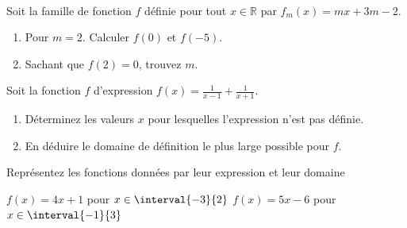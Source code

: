 \documentclass[main.tex]{subfiles}
\begin{document}
\begin{exercise}  \hfill \\
	 Soit la famille de fonction $f$ définie pour tout $x\in\mathbb{R}$ par $f_m(x)=mx+3m-2$.
 	\begin{enumerate}[label=\arabic*),leftmargin=*]
 		\item Pour $m=2$. Calculer $f(0)$ et $f(-5)$. 
 		\item Sachant que $f(2)=0$, trouvez $m$.
 	\end{enumerate}
 \end{exercise}
 \begin{exercise} Soit la fonction $f$ d'expression $f(x)=\tfrac{1}{x-1}+\tfrac{1}{x+1}$. 
	\begin{enumerate}[label=\arabic*),leftmargin=*]
	\item Déterminez les valeurs $x$ pour lesquelles l'expression n'est pas définie.
	\item En déduire le domaine de définition le plus large possible pour $f$.
\end{enumerate} 
 \end{exercise}  

\begin{exercise}\label{chapter04:exercice:representationexpression} Représentez les fonctions données par leur expression et leur domaine
\end{exercise}  
\noindent  \hfill
$f(x)=4x+1$ pour $x\in\interval{-3}{2}$
\hfill 
$f(x)=5x-6$  pour $x\in\interval{-1}{3}$
\hfill \null
\end{document}
